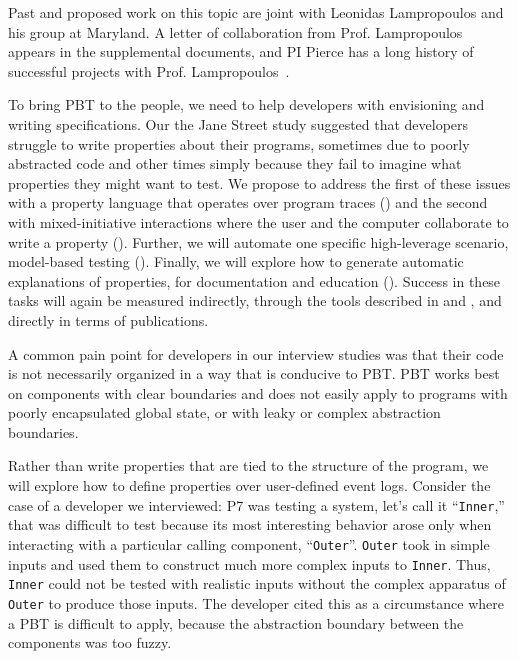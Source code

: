 Past and proposed work on this topic are joint with Leonidas
Lampropoulos and his group at Maryland.
A letter of collaboration
from Prof.{} Lampropoulos appears in the supplemental documents, and
PI Pierce has a long history
of successful projects with Prof.
Lampropoulos~\cite[etc.]{beginners-luck,DBLP:conf/esop/GoldsteinHLP21,lampropoulos_coverage_2019,Lampropoulos&18,OLDlampropoulos19fuzzchick}.


%
To bring PBT to the people, we need to help developers with envisioning and writing
specifications.
Our the Jane Street study suggested that developers struggle to write
properties about their programs, sometimes due to poorly abstracted code and
other times simply because they fail to imagine what properties they
might want to
test. We propose to address the first of these issues with a
property language that operates over program traces () and
the second with mixed-initiative interactions where the user and the computer
collaborate to write a property
().
%
Further, we will automate one specific high-leverage scenario,
model-based testing (). Finally, we will explore how to
generate automatic explanations of properties, for documentation and
education ().
%
Success in these tasks will again be measured indirectly, through the
tools described in  and
, and directly in terms of publications.

A common pain point for developers in our interview studies was that
their code is not necessarily organized in a way that is conducive to
PBT.  PBT works best on components with clear boundaries and does not
easily apply to programs with
poorly encapsulated global state, or with leaky or complex abstraction
boundaries.

Rather than write properties that are tied to the structure of the program,
we will explore
how to define properties over user-defined
event logs. Consider
the case of a developer we interviewed: P7 was testing
a system, let's call it ``\lstinline{Inner},'' that  was difficult to
test because
its most interesting behavior arose only when interacting with a particular calling
component, ``\lstinline{Outer}''.
\lstinline{Outer} took in simple inputs and used them to construct
much more complex inputs to \lstinline{Inner}. Thus, \lstinline{Inner}
could not be tested with
realistic inputs without the complex apparatus of \lstinline{Outer} to
produce those inputs.  The developer cited this as a circumstance where a
PBT is difficult to apply, because the abstraction boundary between the
components was too fuzzy.

